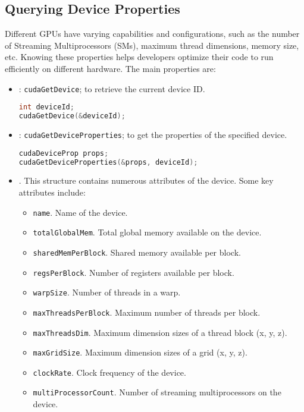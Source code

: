 \subsection{Querying Device Properties}

Different GPUs have varying capabilities and configurations, such as the number of Streaming Multiprocessors (SMs), maximum thread dimensions, memory size, etc. Knowing these properties helps developers optimize their code to run efficiently on different hardware. The main properties are:
\begin{itemize}
    \item {}: \texttt{cudaGetDevice}; to retrieve the current device ID.
    \begin{lstlisting}[language=C++]
int deviceId;
cudaGetDevice(&deviceId);
    \end{lstlisting}

    \item {}: \texttt{cudaGetDeviceProperties}; to get the properties of the specified device.
    \begin{lstlisting}[language=C++]
cudaDeviceProp props;
cudaGetDeviceProperties(&props, deviceId);
    \end{lstlisting}

    \item {}. This structure contains numerous attributes of the device. Some key attributes include:
    \begin{itemize}
        \item \texttt{name}. Name of the device.
        \item \texttt{totalGlobalMem}. Total global memory available on the device.
        \item \texttt{sharedMemPerBlock}. Shared memory available per block.
        \item \texttt{regsPerBlock}. Number of registers available per block.
        \item \texttt{warpSize}. Number of threads in a warp.
        \item \texttt{maxThreadsPerBlock}. Maximum number of threads per block.
        \item \texttt{maxThreadsDim}. Maximum dimension sizes of a thread block (x, y, z).
        \item \texttt{maxGridSize}. Maximum dimension sizes of a grid (x, y, z).
        \item \texttt{clockRate}. Clock frequency of the device.
        \item \texttt{multiProcessorCount}. Number of streaming multiprocessors on the device.
    \end{itemize}
\end{itemize}

